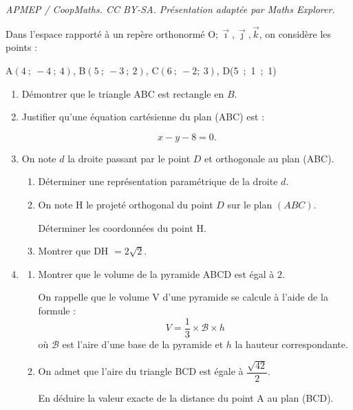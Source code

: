 \documentclass[10pt]{article}
\providecommand{\Oijk}{\(\mathrm{O};\vec{\imath},\vec{\jmath},\vec{k}\)}
\begin{document}
\noindent\textit{APMEP / CoopMaths. CC BY-SA. Présentation adaptée par Maths Explorer.}\par\medskip
Dans l'espace rapporté à un repère orthonormé \Oijk, on considère les points :

\begin{center}
A$(4~;~-4~;~4)$, \quad B$(5~;~-3~;~2)$, \quad C$(6~;~- 2;~3)$, \quad D(5~;~1~;~1)
\end{center}

\begin{enumerate}
\item Démontrer que le triangle ABC est rectangle en $B$.
\item Justifier qu’une équation cartésienne du plan (ABC) est :

\[
x - y - 8 = 0.
\]

\item On note $d$ la droite passant par le point $D$ et orthogonale au plan (ABC).

\medskip

	\begin{enumerate}
		\item Déterminer une représentation paramétrique de la droite $d$.
		\item On note H le projeté orthogonal du point $D$ sur le plan $(ABC)$.
		
Déterminer les coordonnées du point H.
		\item Montrer que DH $= 2\sqrt 2$.
	\end{enumerate}
\item 
	\begin{enumerate}
		\item Montrer que le volume de la pyramide ABCD est égal à $2$.

On rappelle que le volume V d'une pyramide se calcule à l'aide de la formule :
\[V = \dfrac13 \times \mathcal{B} \times h\]
où $\mathcal{B}$ est l'aire d'une base de la pyramide et $h$ la hauteur correspondante.
		\item On admet que l'aire du triangle BCD est égale à $\dfrac{\sqrt{42}}{2}$.

En déduire la valeur exacte de la distance du point A au plan (BCD).
	\end{enumerate}
\end{enumerate}
\end{document}
